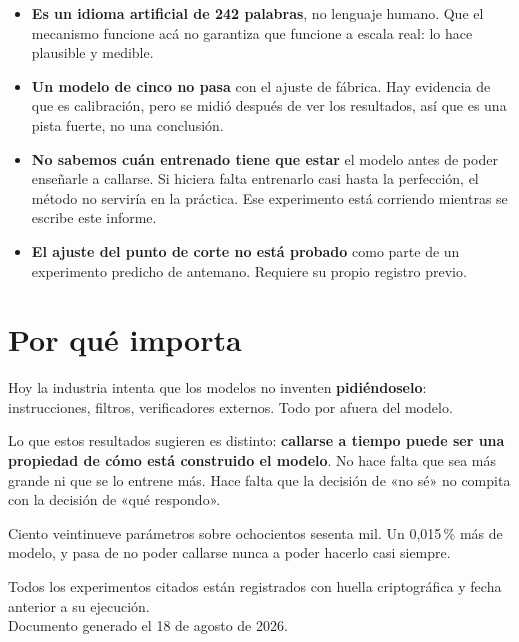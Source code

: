 \documentclass[11pt,a4paper]{article}
\begin{document}
\begin{itemize}
  \item \textbf{Es un idioma artificial de 242 palabras}, no lenguaje humano. Que el mecanismo
  funcione acá no garantiza que funcione a escala real: lo hace plausible y medible.
  \item \textbf{Un modelo de cinco no pasa} con el ajuste de fábrica. Hay evidencia de que es
  calibración, pero se midió después de ver los resultados, así que es una pista fuerte, no una
  conclusión.
  \item \textbf{No sabemos cuán entrenado tiene que estar} el modelo antes de poder enseñarle a
  callarse. Si hiciera falta entrenarlo casi hasta la perfección, el método no serviría en la
  práctica. Ese experimento está corriendo mientras se escribe este informe.
  \item \textbf{El ajuste del punto de corte no está probado} como parte de un experimento
  predicho de antemano. Requiere su propio registro previo.
\end{itemize}

\section{Por qué importa}

Hoy la industria intenta que los modelos no inventen \textbf{pidiéndoselo}: instrucciones,
filtros, verificadores externos. Todo por afuera del modelo.

Lo que estos resultados sugieren es distinto: \textbf{callarse a tiempo puede ser una propiedad
de cómo está construido el modelo}. No hace falta que sea más grande ni que se lo entrene más.
Hace falta que la decisión de «no sé» no compita con la decisión de «qué respondo».

Ciento veintinueve parámetros sobre ochocientos sesenta mil. Un 0,015\,\% más de modelo, y pasa
de no poder callarse nunca a poder hacerlo casi siempre.

\vfill
\begin{center}
{\color{gris}\small
Todos los experimentos citados están registrados con huella criptográfica y fecha anterior a su
ejecución.\\
Documento generado el 18 de agosto de 2026.}
\end{center}
\end{document}
